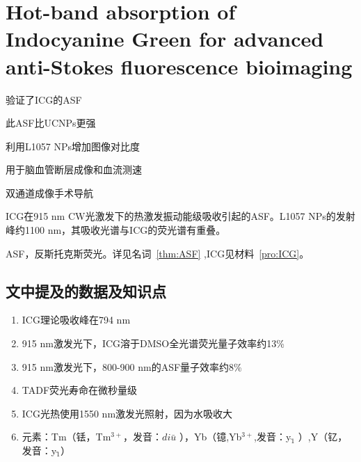 \documentclass[cn,11pt,chinese]{elegantbook}
\begin{document}
\section{Hot-band absorption of Indocyanine Green for advanced anti-Stokes fluorescence bioimaging}

\begin{introduction}[创新点概要]
  \item 验证了ICG的ASF
  \item 此ASF比UCNPs更强
  \item 利用L1057 NPs增加图像对比度
  \item 用于脑血管断层成像和血流测速
  \item 双通道成像手术导航
\end{introduction}

\begin{remark}
  ICG在915 nm CW光激发下的热激发振动能级吸收引起的ASF。L1057 NPs的发射峰约1100 nm，其吸收光谱与ICG的荧光谱有重叠。
\end{remark}

\begin{note}
  ASF，反斯托克斯荧光。详见名词~\vref{thm:ASF} ,ICG见材料~\vref{pro:ICG}。
\end{note}

\subsection{文中提及的数据及知识点}

  \begin{enumerate}
    \item ICG理论吸收峰在794 nm
    \item 915 nm激发光下，ICG溶于DMSO全光谱荧光量子效率约13\%
    \item 915 nm激发光下，800-900 nm的ASF量子效率约8\%
    \item TADF荧光寿命在微秒量级
    \item ICG光热使用1550 nm激发光照射，因为水吸收大
    \item 元素：Tm（铥，Tm$^{3+}$，发音：$di\bar{u}$ ），Yb（镱,Yb$^{3+}$,发音：y$\grave{_1}$ ）,Y（钇，发音：y$\check{_1}$）
  \end{enumerate}
  
\end{document}
